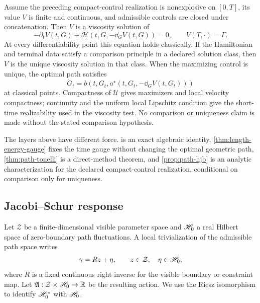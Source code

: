 \begin{proposition}
\label{prop:path-hjb}
Assume the preceding compact-control realization is nonexplosive on
\([0,T]\), its value \(V\) is finite and continuous, and admissible controls
are closed under concatenation.  Then \(V\) is a viscosity solution of
\begin{equation}
  -\partial_tV(t,G)
  +\mathcal H(t,G,-\dd_GV(t,G))=0,
  \qquad
  V(T,\cdot)=\Gamma.
  \tag{P4}
\end{equation}
At every differentiability point this equation holds classically.  If the
Hamiltonian and terminal data satisfy a comparison principle in a declared
solution class, then \(V\) is the unique viscosity solution in that class.
When the maximizing control is unique, the optimal path satisfies
\[
  \dot G_t=b(t,G_t,a^\star(t,G_t,-\dd_GV(t,G_t)))
\]
at classical points.  Compactness of \(\mathcal U\) gives maximizers and local
velocity compactness; continuity and the uniform local Lipschitz condition
give the short-time realizability used in the viscosity test.  No comparison
or uniqueness claim is made without the stated comparison hypothesis.
\end{proposition}

The layers above have different force.   is an exact
algebraic identity, \cref{thm:length-energy-gauge} fixes the time gauge without
changing the optimal geometric path, \cref{thm:path-tonelli} is a direct-method
theorem, and \cref{prop:path-hjb} is an analytic characterization for the
declared compact-control realization, conditional on comparison only for
uniqueness.

\subsection{Jacobi--Schur response}

Let \(\mathcal Z\) be a finite-dimensional visible parameter space and
\(\mathscr H_0\) a real Hilbert space of zero-boundary path fluctuations.  A local
trivialization of the admissible path space writes
\[
  \gamma=Rz+\eta,
  \qquad z\in\mathcal Z,
  \quad \eta\in\mathscr H_0,
\]
where \(R\) is a fixed continuous right inverse for the visible boundary or
constraint map.  Let
\(\mathfrak A:\mathcal Z\times\mathscr H_0\to\mathbb R\) be the resulting action.
We use the Riesz isomorphism to identify \(\mathscr H_0^*\) with \(\mathscr H_0\).

